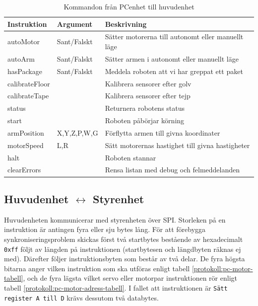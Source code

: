 \begin{table}[h!]
	\centering
	\begin{tabularx}{\textwidth}{| l | l | X |}
		\hline
		\textbf{Instruktion} & \textbf{Argument} & \textbf{Beskrivning} \\\hline
		{autoMotor} & {Sant/Falskt} & {Sätter motorerna till autonomt eller manuellt läge} \\\hline
		{autoArm} & {Sant/Falskt} & {Sätter armen i autonomt eller manuellt läge} \\\hline
		{hasPackage} & {Sant/Falskt} & {Meddela roboten att vi har greppat ett paket} \\\hline
		{calibrateFloor} & {} & {Kalibrera sensorer efter golv} \\\hline
		{calibrateTape} & {} & {Kalibrera sensorer efter tejp} \\\hline
		{status} & {} & {Returnera robotens status} \\\hline
		{start} & {} & {Roboten påbörjar körning} \\\hline
		{armPosition} & {X,Y,Z,P,W,G} & {Förflytta armen till givna koordinater} \\\hline
		{motorSpeed} & {L,R} & {Sätt motorernas hastighet till givna hastigheter} \\\hline
		{halt} & {} & {Roboten stannar} \\\hline
		{clearErrors} & {} & {Rensa listan med debug och felmeddelanden} \\\hline
	\end{tabularx}
	\caption{Kommandon från PCenhet till huvudenhet} \label{protokoll:pc-huvud-tabell}
\end{table}

\subsection{Huvudenhet $\longleftrightarrow$ Styrenhet} \label{protokoll-huvud-styr}

Huvudenheten kommunicerar med styrenheten över SPI. Storleken på en instruktion är antingen fyra eller sju bytes lång. För att förebygga synkroniseringsproblem skickas först två startbytes bestående av hexadecimalt \texttt{0xff} följt av längden på instruktionen (startbytesen och längdbyten räknas ej med). Därefter följer instruktionsbyten som består av två delar. De fyra högsta bitarna anger vilken instruktion som ska utföras enligt tabell \ref{protokoll:pc-motor-tabell}, och de fyra lägsta vilket servo eller motorpar instruktionen rör enligt tabell \ref{protokoll:pc-motor-adress-tabell}. I fallet att instruktionen är \texttt{Sätt register A till D} krävs dessutom två databytes.


